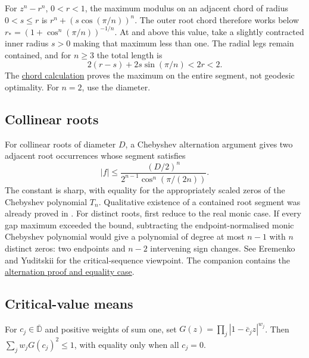 \documentclass[11pt]{article}
\newcommand{\recordlink}[3]{\href{#1\##2}{#3}}
\begin{document}
\noindent{}\label{res:complementary-binomial-chords}
For $z^n-r^n$, $0<r<1$, the maximum modulus on an adjacent chord
of radius $0<s\le r$ is $r^n+(s\cos(\pi/n))^n$.
The outer root chord therefore works below
$r_*=(1+\cos^n(\pi/n))^{-1/n}$. At and above this value, take a
slightly contracted inner radius $s>0$ making that maximum less than one.
The radial legs remain contained, and for $n\ge3$ the total length is
\[
 2(r-s)+2s\sin(\pi/n)<2r<2.
\]
The \recordlink{erdos1041-lemniscate-reasoning-surface.pdf}{binomial-chord-calculation}
{chord calculation} proves the maximum on the entire segment, not
geodesic optimality. For $n=2$, use the diameter.

\subsection{Collinear roots}\label{sec:collinear}\label{bdry:solved-polynomial-families}
\noindent{}\label{res:sharp-collinear-root-diameter}
For collinear roots of diameter $D$, a Chebyshev alternation argument
gives two adjacent root occurrences whose segment satisfies
\[
 |f|\le\frac{(D/2)^n}{2^{n-1}\cos^n(\pi/(2n))}.
\]
The constant is sharp, with equality for the appropriately scaled zeros
of the Chebyshev polynomial $T_n$. Qualitative existence of a contained root segment was already
proved in \cite[Theorem~1]{ehp1958}. For distinct roots, first reduce
to the real monic case. If every gap maximum exceeded the bound,
subtracting the endpoint-normalised monic Chebyshev
polynomial would give a polynomial of degree at most $n-1$ with $n$
distinct zeros: two endpoints and $n-2$ intervening sign changes.
See Eremenko and Yuditskii
\cite[\S1 and Theorem~1]{eremenko-yuditskii} for the critical-sequence
viewpoint. The companion contains the
\recordlink{erdos1041-lemniscate-reasoning-surface.pdf}{collinear-proof}
{alternation proof and equality case}.

\subsection{Critical-value means}\label{sec:freepoint}
\noindent{}\label{res:fp-weighted-all-degree}
For $c_j\in\overline{\mathbb D}$ and positive weights of sum
one, set $G(z)=\prod_j|1-\bar c_jz|^{w_j}$. Then
$\sum_jw_jG(c_j)^2\le1$, with equality only when all $c_j=0$.
\end{document}

